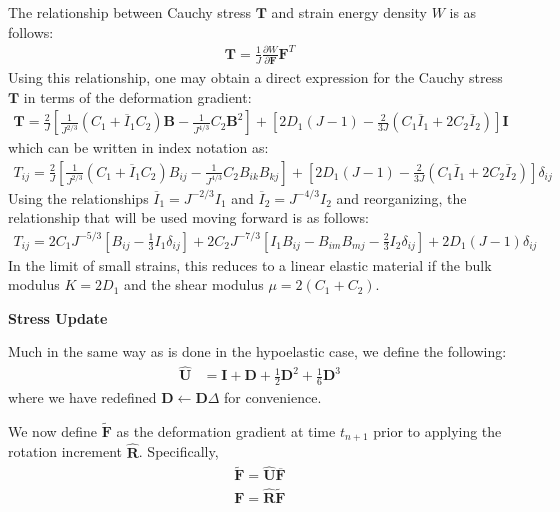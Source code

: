 The relationship between Cauchy stress ${\bm T}$ and strain energy density $W$ is as follows:
\begin{align}
{\bm T} = \frac{1}{J}\frac{\partial W}{\partial {\bm F}}{\bm F}^{T}
\end{align}
Using this relationship, one may obtain a direct expression for the Cauchy stress ${\bm T}$ in terms of the deformation gradient:
\begin{align}
{\bm T} = \frac{2}{J}\left[\frac{1}{J^{2/3}}(C_1 + \overline{I}_1{C_2}){\bm B} - \frac{1}{J^{4/3}}C_2{\bm B}^2\right] + \left[2D_1(J-1) - \frac{2}{3J}(C_1\overline{I}_1 + 2C_2\overline{I}_2)\right]{\bm I}
\end{align}
which can be written in index notation as:
\begin{align}
T_{ij} = \frac{2}{J}\left[\frac{1}{J^{2/3}}(C_1 + \overline{I}_{1}C_2)B_{ij} - \frac{1}{J^{4/3}}C_2B_{ik}B_{kj}\right] + \left[2D_1(J-1) - \frac{2}{3J}(C_1\overline{I}_{1} + 2C_2\overline{I}_{2})\right]\delta_{ij}
\end{align}
Using the relationships $\overline{I}_{1} = J^{-2/3}I_1$ and $\overline{I}_{2} = J^{-4/3}I_2$ and reorganizing, the relationship that will be used moving forward is as follows:
\begin{align}
\label{eqn:stress}
T_{ij} = 2C_1J^{-5/3}\left[B_{ij} - \frac{1}{3}I_1\delta_{ij}\right] + 2C_2J^{-7/3}\left[I_1B_{ij} - B_{im}B_{mj} - \frac{2}{3}I_2\delta_{ij}\right] + 2D_1(J-1)\delta_{ij}
\end{align}
In the limit of small strains, this reduces to a linear elastic material if the bulk modulus $K = 2D_1$ and the shear modulus $\mu = 2(C_1 + C_2)$.

\textbf{Stress Update}

Much in the same way as is done in the hypoelastic case, we define the following:
\begin{align}
\hat{\bm {U}} &= {\bm I} + {\bm D} + \frac{1}{2}{\bm D}^2 + \frac{1}{6}{\bm D}^3
\end{align}
where we have redefined ${\bm D}\leftarrow{\bm D}\Delta$ for convenience.

We now define $\tilde {\bm F}$ as the deformation gradient at time $t_{n+1}$ prior to applying the rotation increment $\hat{\bm R}$. Specifically,
\begin{align}
\tilde {\bm F} = \hat{\bm U}\overline{\bm F} \\
{\bm F} = \hat{\bm R}\tilde {\bm F}
\end{align}

